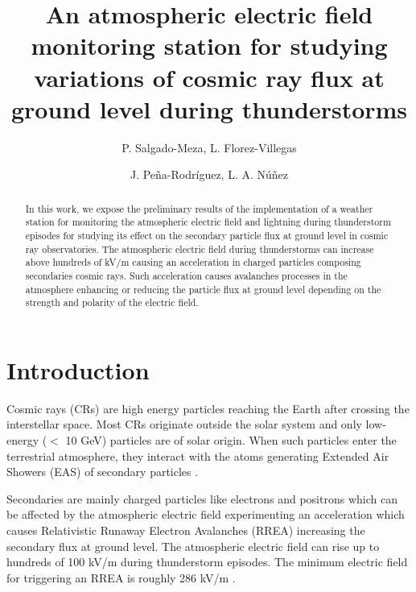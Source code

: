 \documentclass[a4paper]{jpconf}
\begin{document}
\title{An atmospheric electric field monitoring station for studying variations of cosmic ray flux at ground level during thunderstorms}

\author{P. Salgado-Meza, L. Florez-Villegas}

\address{Escuela de Ingenier\'ia El\'ectrica, Electr\'onica y de Telecomunicaciones, Universidad Industrial de Santander, Bucaramanga-Colombia}

\author{J. Pe\~na-Rodr\'iguez, L. A. N\'u\~nez}

\address{Escuela de F\'{\i}sica, Universidad Industrial de Santander, Bucaramanga-Colombia}


\begin{abstract}
In this work, we expose the preliminary results of the implementation of a weather station for monitoring the atmospheric electric field and lightning during thunderstorm episodes for studying its effect on the secondary particle flux at ground level in cosmic ray observatories. The atmospheric electric field during thunderstorms can increase above hundreds of kV/m causing an acceleration in charged particles composing secondaries cosmic rays. Such acceleration causes avalanches processes in the atmosphere enhancing or reducing the particle flux at ground level depending on the strength and polarity of the electric field. 

\end{abstract}

\section{Introduction}
Cosmic rays (CRs) are high energy particles reaching the Earth after crossing the interstellar space. Most CRs originate outside the solar system and only low-energy ($<$ 10 GeV) particles are of solar origin. When such particles enter the terrestrial atmosphere, they interact with the atoms generating Extended Air Showers (EAS) of secondary particles \cite{Spurio2015}.

Secondaries are mainly charged particles like electrons and positrons which can be affected by the atmospheric electric field experimenting an acceleration \cite{marshall2005observed} which causes Relativistic Runaway Electron Avalanches (RREA) \cite{dwyer2011low} increasing the secondary flux at ground level. The atmospheric electric field can rise up to hundreds of 100 kV/m during thunderstorm episodes. The minimum electric field for triggering an RREA is roughly 286 kV/m \cite{Skeltved2017, colalillo2019}.
\end{document}
